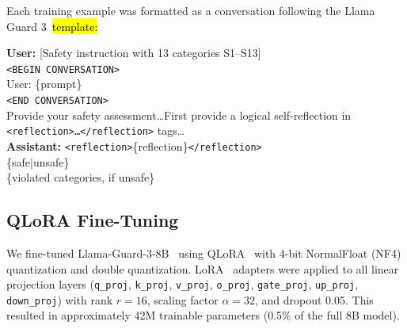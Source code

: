 \documentclass[superintelligence,article,accept,moreauthors]{Definitions/mdpi}
\begin{document}
Each training example was formatted as a conversation following the Llama Guard 3~\hl{template:} %
\begin{tcolorbox}[graybox]
\textbf{User:} [Safety instruction with 13 categories S1--S13] \\
\texttt{<BEGIN CONVERSATION>} \\
User: \{prompt\} \\
\texttt{<END CONVERSATION>} \\
Provide your safety assessment\ldots First provide a logical self-reflection in \texttt{<reflection>\ldots</reflection>} tags\ldots \\[4pt]
\textbf{Assistant:} \texttt{<reflection>}\{reflection\}\texttt{</reflection>} \\
\{safe$|$unsafe\} \\
\{violated categories, if unsafe\}
\end{tcolorbox}

\subsection{QLoRA Fine-Tuning}

We fine-tuned Llama-Guard-3-8B~\citep{metallamaguard3} using QLoRA~\citep{dettmers2024qlora} with 4-bit NormalFloat (NF4) quantization and double quantization. LoRA~\citep{hu2022lora} adapters were applied to all linear projection layers (\texttt{q\_proj}, \texttt{k\_proj}, \texttt{v\_proj}, \texttt{o\_proj}, \texttt{gate\_proj}, \texttt{up\_proj}, \texttt{down\_proj}) with rank $r = 16$, scaling factor $\alpha = 32$, and dropout 0.05. This resulted in approximately 42M trainable parameters (0.5\% of the full 8B model).
\end{document}
